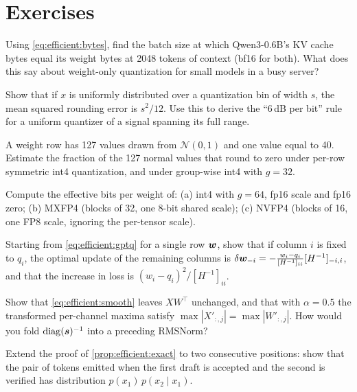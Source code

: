 \section{Exercises}
\begin{exercise}
Using \cref{eq:efficient:bytes}, find the batch size at which Qwen3-0.6B's KV cache bytes
equal its weight bytes at 2048 tokens of context (bf16 for both). What does this say
about weight-only quantization for small models in a busy server?
\end{exercise}
\begin{exercise}
Show that if $x$ is uniformly distributed over a quantization bin of width $s$, the mean
squared rounding error is $s^2/12$. Use this to derive the ``6\,dB per bit'' rule for a
uniform quantizer of a signal spanning its full range.
\end{exercise}
\begin{exercise}[outliers]
A weight row has 127 values drawn from $\mathcal N(0,1)$ and one value equal to 40.
Estimate the fraction of the 127 normal values that round to zero under per-row
symmetric int4 quantization, and under group-wise int4 with $g=32$.
\end{exercise}
\begin{exercise}[metadata]
Compute the effective bits per weight of: (a) int4 with $g=64$, fp16 scale and fp16
zero; (b) MXFP4 (blocks of 32, one 8-bit shared scale); (c) NVFP4 (blocks of 16, one
FP8 scale, ignoring the per-tensor scale).
\end{exercise}
\begin{exercise}
Starting from \cref{eq:efficient:gptq} for a single row $\bm{w}$, show that if column
$i$ is fixed to $q_i$, the optimal update of the remaining columns is
$\delta\bm{w}_{-i} = -\frac{w_i-q_i}{[H^{-1}]_{ii}}[H^{-1}]_{-i,i}$, and that the
increase in loss is $(w_i-q_i)^2/[H^{-1}]_{ii}$.
\end{exercise}
\begin{exercise}[SmoothQuant]
Show that \cref{eq:efficient:smooth} leaves $XW^\top$ unchanged, and that with
$\alpha=0.5$ the transformed per-channel maxima satisfy
$\max|X'_{:,j}|=\max|W'_{:,j}|$. How would you fold $\mathrm{diag}(\bm{s})^{-1}$ into
a preceding RMSNorm?
\end{exercise}
\begin{exercise}
Extend the proof of \cref{prop:efficient:exact} to two consecutive positions: show that
the pair of tokens emitted when the first draft is accepted and the second is
verified has distribution $p(x_1)\,p(x_2\mid x_1)$.
\end{exercise}
